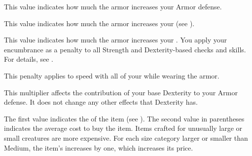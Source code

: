          This value indicates how much the armor increases your Armor defense.

         This value indicates how much the armor increases your  (see ).

         This value indicates how much the armor increases your .
        You apply your encumbrance as a penalty to all Strength and Dexterity-based checks and skills.
        For details, see .

         This penalty applies to speed with all of your  while wearing the armor.

         This multiplier affects the contribution of your base Dexterity to your Armor defense.
        It does not change any other effects that Dexterity has.

         The first value indicates the  of the item (see ).
        The second value in parentheses indicates the average cost to buy the item.
        Items crafted for unusually large or small creatures are more expensive.
        For each size category larger or smaller than Medium, the item's  increases by one, which increases its price.

